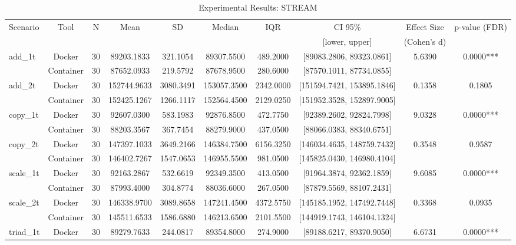 \documentclass{article}
\begin{document}

\begin{table}[h]
\centering
\small
\caption{Experimental Results: STREAM}
\label{tab:stream}
\begin{tabular}{lccccccccc}
\toprule
Scenario & Tool & N & Mean & SD & Median & IQR & CI 95\% & Effect Size & p-value (FDR) \\
 & & & & & & & [lower, upper] & (Cohen's d) & \\
\midrule
\multirow{2}{*}{add\_1t} & Docker & 30 & 89203.1833 & 321.1054 & 89307.5500 & 489.2000 & [89083.2806, 89323.0861] & 5.6390 & 0.0000*** \\
 & Container & 30 & 87652.0933 & 219.5792 & 87678.9500 & 280.6000 & [87570.1011, 87734.0855] &  &  \\
\midrule
\multirow{2}{*}{add\_2t} & Docker & 30 & 152744.9633 & 3080.3491 & 153057.3500 & 2342.0000 & [151594.7421, 153895.1846] & 0.1358 & 0.1805 \\
 & Container & 30 & 152425.1267 & 1266.1117 & 152564.4500 & 2129.0250 & [151952.3528, 152897.9005] &  &  \\
\midrule
\multirow{2}{*}{copy\_1t} & Docker & 30 & 92607.0300 & 583.1983 & 92876.8500 & 472.7750 & [92389.2602, 92824.7998] & 9.0328 & 0.0000*** \\
 & Container & 30 & 88203.3567 & 367.7454 & 88279.9000 & 437.0500 & [88066.0383, 88340.6751] &  &  \\
\midrule
\multirow{2}{*}{copy\_2t} & Docker & 30 & 147397.1033 & 3649.2166 & 146384.7500 & 6156.3250 & [146034.4635, 148759.7432] & 0.3548 & 0.9587 \\
 & Container & 30 & 146402.7267 & 1547.0653 & 146955.5500 & 981.0500 & [145825.0430, 146980.4104] &  &  \\
\midrule
\multirow{2}{*}{scale\_1t} & Docker & 30 & 92163.2867 & 532.6619 & 92349.3500 & 413.0500 & [91964.3874, 92362.1859] & 9.6085 & 0.0000*** \\
 & Container & 30 & 87993.4000 & 304.8774 & 88036.6000 & 267.0500 & [87879.5569, 88107.2431] &  &  \\
\midrule
\multirow{2}{*}{scale\_2t} & Docker & 30 & 146338.9700 & 3089.8658 & 147241.4500 & 4372.5750 & [145185.1952, 147492.7448] & 0.3368 & 0.0935 \\
 & Container & 30 & 145511.6533 & 1586.6880 & 146213.6500 & 2101.5500 & [144919.1743, 146104.1324] &  &  \\
\midrule
\multirow{2}{*}{triad\_1t} & Docker & 30 & 89279.7633 & 244.0817 & 89354.8000 & 274.9000 & [89188.6217, 89370.9050] & 6.6731 & 0.0000*** \\

\end{tabular}
\end{table}
\end{document}
